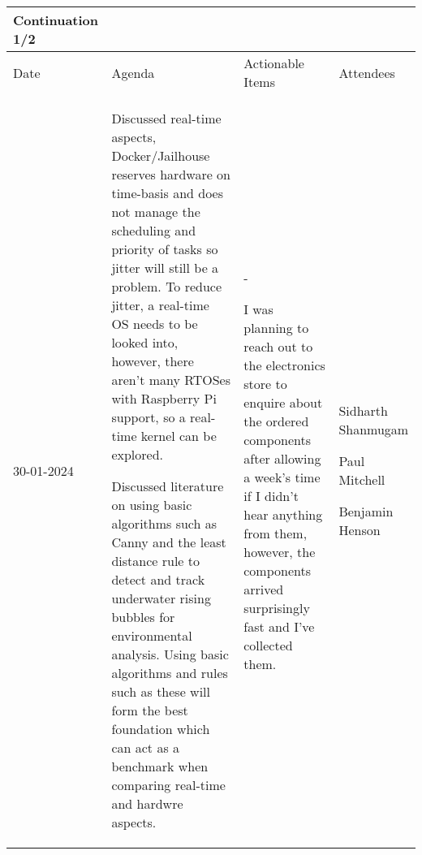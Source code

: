 \begin{table}[!h]
    \centering
    \begin{tabularx}{\textwidth}{|l|X|X|X|}
        \hline
        Continuation 1/2 \\
        \hline
        \hline
        Date & Agenda & Actionable Items & Attendees \\
        \hline
        \hline
        30-01-2024 & 
        \begin{myitemize}
            \item Discussed real-time aspects, Docker/Jailhouse reserves hardware on time-basis and does not manage the scheduling and priority of tasks so jitter will still be a problem. To reduce jitter, a real-time OS needs to be looked into, however, there aren't many RTOSes with Raspberry Pi support, so a real-time kernel can be explored.
            \item Discussed literature on using basic algorithms such as Canny and the least distance rule to detect and track underwater rising bubbles for environmental analysis. Using basic algorithms and rules such as these will form the best foundation which can act as a benchmark when comparing real-time and hardwre aspects.
        \end{myitemize} &
        \begin{myitemize}
            \item -
            \item I was planning to reach out to the electronics store to enquire about the ordered components after allowing a week's time if I didn't hear anything from them, however, the components arrived surprisingly fast and I've collected them.
        \end{myitemize} &
        \begin{myitemize}
            \item Sidharth Shanmugam
            \item Paul Mitchell
            \item Benjamin Henson
        \end{myitemize} \\
        \hline
    \end{tabularx}
\end{table}

\pagebreak

